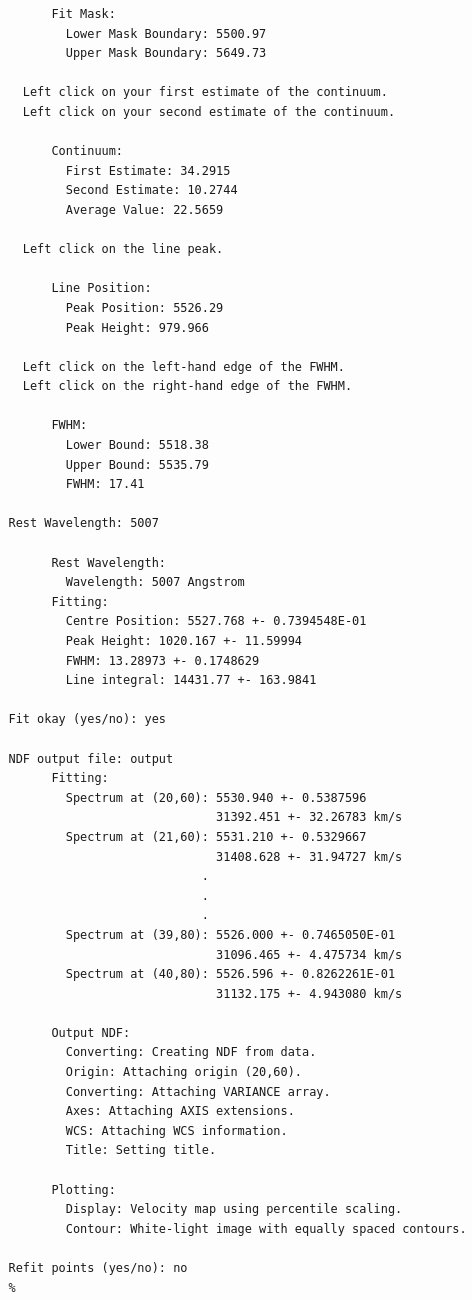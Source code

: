 \documentclass[twoside,11pt]{article}
\begin{document}
\begin{\htmlonly}
{\begin{verbatim}
         Fit Mask:
           Lower Mask Boundary: 5500.97
           Upper Mask Boundary: 5649.73
 
     Left click on your first estimate of the continuum.
     Left click on your second estimate of the continuum.
 
         Continuum:
           First Estimate: 34.2915
           Second Estimate: 10.2744
           Average Value: 22.5659
 
     Left click on the line peak.
  
         Line Position:
           Peak Position: 5526.29
           Peak Height: 979.966
 
     Left click on the left-hand edge of the FWHM.
     Left click on the right-hand edge of the FWHM.
 
         FWHM:
           Lower Bound: 5518.38
           Upper Bound: 5535.79
           FWHM: 17.41
 
   Rest Wavelength: 5007
 
         Rest Wavelength:
           Wavelength: 5007 Angstrom
         Fitting:
           Centre Position: 5527.768 +- 0.7394548E-01
           Peak Height: 1020.167 +- 11.59994
           FWHM: 13.28973 +- 0.1748629
           Line integral: 14431.77 +- 163.9841
 
   Fit okay (yes/no): yes
 
   NDF output file: output
         Fitting:
           Spectrum at (20,60): 5530.940 +- 0.5387596
                                31392.451 +- 32.26783 km/s
           Spectrum at (21,60): 5531.210 +- 0.5329667
                                31408.628 +- 31.94727 km/s
                              .
                              .
                              .
           Spectrum at (39,80): 5526.000 +- 0.7465050E-01
                                31096.465 +- 4.475734 km/s
           Spectrum at (40,80): 5526.596 +- 0.8262261E-01
                                31132.175 +- 4.943080 km/s
 
         Output NDF:
           Converting: Creating NDF from data.
           Origin: Attaching origin (20,60).
           Converting: Attaching VARIANCE array.
           Axes: Attaching AXIS extensions.
           WCS: Attaching WCS information.
           Title: Setting title.

         Plotting:
           Display: Velocity map using percentile scaling.
           Contour: White-light image with equally spaced contours.
 
   Refit points (yes/no): no
   %
\end{verbatim}\normalsize

}
\end{\htmlonly}
\end{document}
